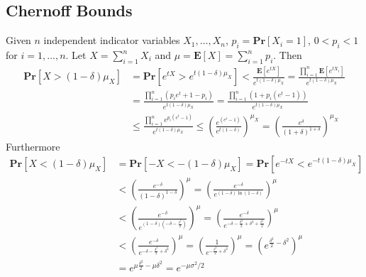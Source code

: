 \documentclass[12pt]{article}
\begin{document}
\subsection*{Chernoff Bounds}
Given $n$ independent indicator variables $X_1, \hdots, X_n$, $p_i = \mathbf{Pr}\left[ X_i = 1 \right]$, $0 < p_i < 1$ for $i=1, \hdots, n$. Let $X=\sum_{i=1}^n X_i$ and $\mu = \mathbf{E} \left[ X \right] = \sum_{i=1}^n p_i$. Then
\begin{align*}
\mathbf{Pr}\left[ X > (1-\delta)\mu_X \right]
&= \mathbf{Pr}\left[ e^{tX} > e^{t(1-\delta)\mu_X} \right]
< \frac{\mathbf{E}\left[ e^{tX} \right]}{e^{t(1-\delta)\mu_X}}
= \frac{\prod_{i=1}^n \mathbf{E}\left[ e^{tX_i} \right]}{e^{t(1-\delta)\mu_X}} \\
&= \frac{\prod_{i=1}^n \left( p_i e^t + 1-p_i \right)}{e^{t(1-\delta)\mu_X}}
= \frac{\prod_{i=1}^n \left( 1 + p_i (e^t - 1) \right)}{e^{t(1-\delta)\mu_X}} \\
&\leq \frac{\prod_{i=1}^n e^{p_i (e^t-1)}}{e^{t(1-\delta)\mu_X}}
\leq \left( \frac{e^{(e^t-1)}}{e^{t(1-\delta)}} \right)^{\mu_X}
= \left( \frac{e^{\delta}}{\left( 1 + \delta \right)^{1+\delta}} \right)^{\mu_X}
\end{align*}
Furthermore
\begin{align*}
\mathbf{Pr}\left[ X < (1-\delta)\mu_X \right]
&= \mathbf{Pr}\left[ -X < -(1-\delta)\mu_X \right]
= \mathbf{Pr}\left[ e^{-tX} < e^{-t(1-\delta)\mu_X} \right] \\
&< \left( \frac{e^{-\delta}}{\left( 1-\delta \right)^{1-\delta}} \right)^\mu
= \left( \frac{e^{-\delta}}{e^{\left( 1-\delta \right) \ln (1-\delta)}} \right)^\mu \\
&< \left( \frac{e^{-\delta}}{e^{\left( 1-\delta \right)\left( -\delta - \frac{\delta^2}{2} \right)}} \right)^\mu
=  \left( \frac{e^{-\delta}}{e^{-\delta - \frac{\delta^2}{2} + \delta^2 + \frac{\delta^3}{2}}  } \right)^\mu \\
&<  \left( \frac{e^{-\delta}}{e^{-\delta - \frac{\delta^2}{2} + \delta^2}  } \right)^\mu = \left( \frac{1}{e^{-\frac{\delta^2}{2} + \delta^2}  } \right)^\mu
= \left( e^{\frac{\delta^2}{2} - \delta^2} \right)^\mu \\
&= e^{\mu\frac{\delta^2}{2} - \mu\delta^2} = e^{-\mu\sigma^2/2}
\end{align*}
\end{document}
